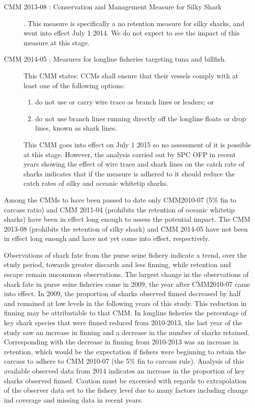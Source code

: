 \documentclass[12pt]{SCreport}
\begin{document}
\begin{description}
\item[CMM 2013-08 : Conservation and Management Measure for Silky Shark]. This measure is specifically a no retention measure for silky sharks, and went into effect July 1 2014. We do not expect to see the impact of this measure at this stage. 

\item[CMM 2014-05 : Measures for longline fisheries targeting tuna and billfish.] This CMM  states: 
      CCMs shall ensure that their vessels comply with at least one of the following options:
        \begin{enumerate}
            \item  do not use or carry wire trace as branch lines or leaders; or
            \item  do not use branch lines running directly off the longline floats or drop lines, known as shark lines. 
           \end{enumerate}
This CMM goes into effect on July 1 2015 so no assessment of it is possible at this stage. However, the analysis carried out by SPC OFP \citep{Rice2012_a, Bromhead2013_a, Caneco2014_a} in recent years showing the effect of wire trace and shark lines on the catch rate of sharks indicates that if the measure is adhered to it should reduce the catch rates of silky and oceanic whitetip sharks.

 \end{description}
Among the CMMs to have been passed to date only  CMM2010-07 (5\% fin to carcass ratio) and   CMM 2011-04 (prohibits the retention of oceanic whitetip sharks) have been in effect long enough to assess the potential impact.  The CMM 2013-08 (prohibits the retention of silky shark)  and CMM 2014-05 have not been in effect long enough and  have not yet come into effect, respectively.   

Observations of shark fate from the purse seine fishery indicate a trend, over the study period, towards  greater discards and less finning, while retention and escape remain  uncommon observations.  The largest change in the observations of shark fate in purse seine fisheries came in 2009, the year after  CMM2010-07 came into effect.  
In 2009, the proportion of sharks observed finned decreased by half and remained at low levels in the following years of this study.  This reduction in finning may be attributable to that CMM.   In longline fisheries the percentage of key shark species that were finned reduced from 2010-2013, the last year of the study saw an increase in finning and a decrease in the number of sharks retained.  Corresponding with the decrease in finning from 2010-2013 was an increase in retention, which would be the expectation if fishers were beginning to retain the carcass to adhere to CMM 2010-07 (the 5\% fin to carcass rule). Analysis of this available observed data from 2014 indicates an increase in the proportion of key sharks observed finned.   Caution must be excersied with regards to extrapolation of the observer data set to the fishery level due to many factors including change ind coverage and missing data in recent years. 
\end{document}
